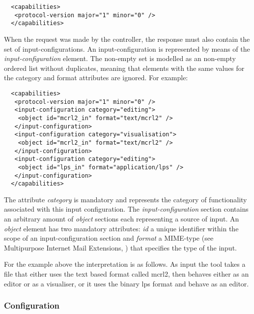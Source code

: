 \documentclass{article}
\begin{document}
   \small \begin{verbatim}
  <capabilities>
   <protocol-version major="1" minor="0" />
  </capabilities>\end{verbatim}
  \normalsize

   \noindent When the request was made by the controller, the response must
   also contain the set of input-configurations. An input-configuration is
   represented by means of the \textit{input-configuration} element. The
   non-empty set is modelled as an non-empty ordered list without duplicates,
   meaning that elements with the same values for the category and format
   attributes are ignored. For example:

   \small \begin{verbatim}
  <capabilities>
   <protocol-version major="1" minor="0" />
   <input-configuration category="editing">
    <object id="mcrl2_in" format="text/mcrl2" />
   </input-configuration>
   <input-configuration category="visualisation">
    <object id="mcrl2_in" format="text/mcrl2" />
   </input-configuration>
   <input-configuration category="editing">
    <object id="lps_in" format="application/lps" />
   </input-configuration>
  </capabilities>\end{verbatim}
  \normalsize

   \noindent The attribute \textit{category} is mandatory and represents the
   category of functionality associated with this input configuration. The
   \textit{input-configuration} section contains an arbitrary amount of
   \textit{object} sections each representing a source of input. An
   \textit{object} element has two mandatory attributes: \textit{id} a unique
   identifier within the scope of an input-configuration section and
   \textit{format} a MIME-type (see Multipurpose Internet Mail Extensions,
   \cite{rfc2822}) that specifies the type of the input.

   For the example above the interpretation is as follows. As input the tool
   takes a file that either uses the text based format called mcrl2, then
   behaves either as an editor or as a visualiser, or it uses the binary lps
   format and behave as an editor.

  \subsubsection{Configuration} \label{ss:implementation_configuration}

\end{document}
